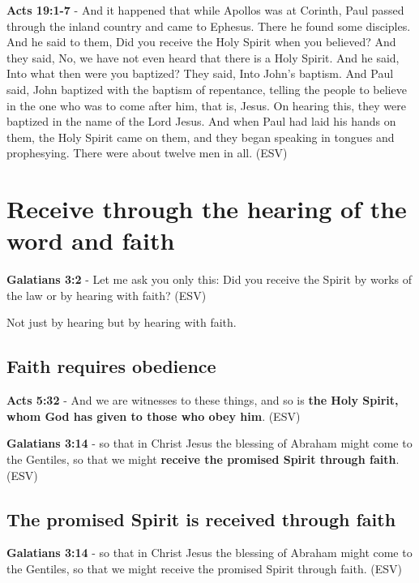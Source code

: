 \documentclass[11pt]{article}
\begin{document}
\textbf{Acts 19:1-7} - And it happened that while Apollos was at Corinth, Paul passed through the inland country and came to Ephesus. There he found some disciples. And he said to them, Did you receive the Holy Spirit when you believed? And they said, No, we have not even heard that there is a Holy Spirit. And he said, Into what then were you baptized? They said, Into John's baptism. And Paul said, John baptized with the baptism of repentance, telling the people to believe in the one who was to come after him, that is, Jesus. On hearing this, they were baptized in the name of the Lord Jesus. And when Paul had laid his hands on them, the Holy Spirit came on them, and they began speaking in tongues and prophesying. There were about twelve men in all. (ESV)

\section{Receive through the hearing of the word and faith}
\label{sec:orgaaf7cbf}
\textbf{Galatians 3:2} - Let me ask you only this: Did you receive the Spirit by works of the law or by hearing with faith? (ESV)

Not just by hearing but by hearing with faith.

\subsection{Faith requires obedience}
\label{sec:org2dd5382}
\textbf{Acts 5:32} - And we are witnesses to these things, and so is \textbf{the Holy Spirit, whom God has given to those who obey him}. (ESV)

\textbf{Galatians 3:14} - so that in Christ Jesus the blessing of Abraham might come to the Gentiles, so that we might \textbf{receive the promised Spirit through faith}. (ESV)

\subsection{The promised Spirit is received through faith}
\label{sec:org6f66d60}
\textbf{Galatians 3:14} - so that in Christ Jesus the blessing of Abraham might come to the Gentiles, so that we might receive the promised Spirit through faith. (ESV)
\end{document}
